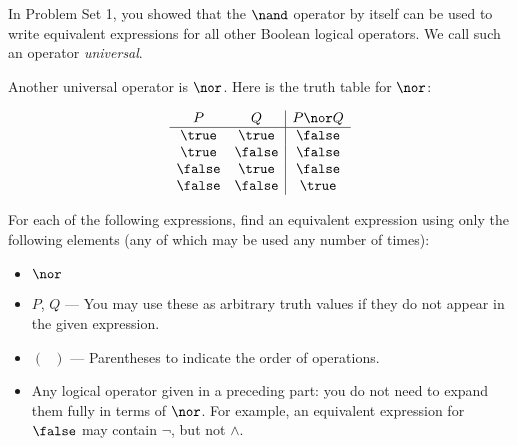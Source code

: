 \documentclass[12pt,oneside]{article}
\begin{document}




\begin{problem}{20}

In Problem Set 1, you showed that the $\nand$ operator by itself can be used to write equivalent expressions for all other Boolean logical operators. We call such an operator \emph{universal}.


\bparts

 Another universal operator is $\nor$. Here is the truth table for $\nor$:

%
\[
\begin{array}{cc|c}
P & Q & P \nor Q \\ \hline
\true & \true & \false \\
\true & \false & \false \\
\false & \true & \false \\
\false & \false & \true
\end{array}
\]


For each of the following expressions, find an equivalent expression using only the following elements (any of which may be used any number of times):

\begin{itemize}
\item $\nor$
\item $P$, $Q$ --- You may use these as arbitrary truth values if they do not appear in the given expression.
\item $(\mbox{ })$ --- Parentheses to indicate the order of operations.
\item Any logical operator given in a preceding part: you do not need to expand them fully in terms of $\nor$. For example, an equivalent expression for $\false$ may contain $\neg$, but not $\wedge$.
\end{itemize}


\end{problem}
\end{document}
